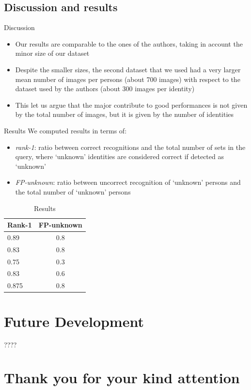 \documentclass{beamer}
\begin{document}
\subsection{Discussion and results}
\begin{frame}{Discussion}
	\begin{itemize}
		\item Our results are comparable to the ones of the authors,
			taking in account the minor size of our dataset
		\item Despite the smaller sizes, the second dataset that we
			used had a very larger mean number of images per
			persons (about 700 images) with respect to the dataset
			used by the authors (about 300 images per identity)
		\item This let us argue that the major contribute to good
			performances is not given by the total number of images,
			but it is given by the number of identities
	\end{itemize}
\end{frame}

\begin{frame}{Results}
	We computed results in terms of:
	\begin{itemize}
		\item \textit{rank-1}: ratio between correct recognitions and
			the total number of sets in the query, where `unknown'
			identities are considered correct if detected as
			`unknown'
		\item \textit{FP-unknown}: ratio between uncorrect recognition
			of `unknown' persons and the total number of `unknown'
			persons
	\end{itemize}
	\begin{table}[]
		\centering
		\caption{Results}
		\label{tab:results}
		\begin{tabular}{|l|c|}
			\hline
			\bf Rank-1 & \bf FP-unknown \\ \hline
			0.89	   & 0.8 \\ \hline
			0.83	   & 0.8 \\ \hline
			0.75	   & 0.3 \\ \hline
			0.83	   & 0.6 \\ \hline
			0.875      & 0.8 \\ \hline
		\end{tabular}
	\end{table}

\end{frame}

\section{Future Development}
\begin{frame}
	????
\end{frame}

\section*{Thank you for your kind attention}
\end{document}
